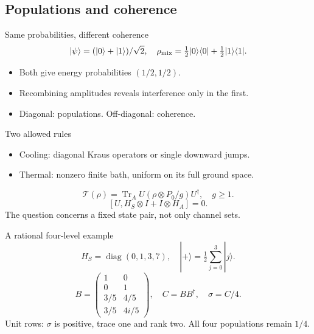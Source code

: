 \documentclass{beamer}
\begin{document}
\subsection{Populations and coherence}
\begin{frame}{Same probabilities, different coherence}
\[|\psi\rangle=(|0\rangle+|1\rangle)/\sqrt2,\quad
 \rho_{\rm mix}=\tfrac12|0\rangle\langle0|+\tfrac12|1\rangle\langle1|.\]
 \begin{itemize}
 \item Both give energy probabilities $(1/2,1/2)$.
 \item Recombining amplitudes reveals interference only in the first.
 \item Diagonal: populations. Off-diagonal: coherence.
 \end{itemize}
\end{frame}
\begin{frame}{Two allowed rules}
\begin{itemize}
 \item Cooling: diagonal Kraus operators or single downward jumps.
 \item Thermal: nonzero finite bath, uniform on its full ground space.
 \end{itemize}
 \[\mathcal T(\rho)=\operatorname{Tr}_A U(\rho\otimes P_0/g)U^\dagger,\quad g\geq1.\]
 \[[U,H_S\otimes I+I\otimes H_A]=0.\]
 The question concerns a fixed state pair, not only channel sets.
\end{frame}
\begin{frame}{A rational four-level example}
\[H_S=\operatorname{diag}(0,1,3,7),\quad |+\rangle=\tfrac12\sum_{j=0}^3|j\rangle.\]
 \[B=\begin{pmatrix}1&0\\0&1\\3/5&4/5\\3/5&4i/5\end{pmatrix},\quad C=BB^\dagger,\quad\sigma=C/4.\]
 Unit rows: $\sigma$ is positive, trace one and rank two.
 All four populations remain $1/4$.
\end{frame}
\end{document}
